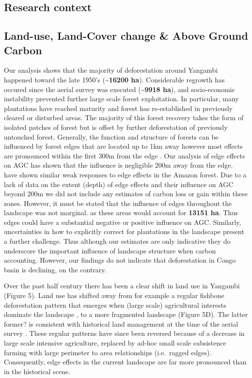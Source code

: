 \documentclass[remote sensing,article,submit,moreauthors,pdftex]{mdpi}
\begin{document}
\hypertarget{research-context}{%
\subsection{Research context}\label{research-context}}

\hypertarget{land-use-land-cover-change-above-ground-carbon}{%
\subsection{Land-use, Land-Cover change \& Above Ground
Carbon}\label{land-use-land-cover-change-above-ground-carbon}}

Our analysis shows that the majority of deforestation around Yangambi
happened toward the late 1950's (\textbf{\textasciitilde{}16200 ha}).
Considerable regrowth has occured since the aerial survey was executed
(\textbf{\textasciitilde{}9918 ha}), and socio-economic instability
prevented further large scale forest exploitation. In particular, many
plantations have reached maturity and forest has re-established in
previously cleared or disturbed areas. The majority of this forest
recovery takes the form of isolated patches of forest but is offset by
further deforestation of previously untouched forest. Generally, the
function and structure of forests can be influenced by forest edges that
are located up to 1km away however most effects are pronounced within
the first 300m from the edge \citep{gascon2000}. Our analysis of edge
effects on AGC has shown that the influence is negligible 200m away from
the edge. \citet{phillips2006} have shown similar weak responses to edge
effects in the Amazon forest. Due to a lack of data on the extent
(depth) of edge effects and their influence on AGC beyond 200m we did
not include any estimates of carbon loss or gain within these zones.
However, it must be stated that the influence of edges throughout the
landscape was not marginal. as these areas would account for
\textbf{13151 ha}. Thus edges could have a substantial negative
\citep{brinck2017} or positive \citep{reinmann2017} influence on AGC.
Similarly, uncertainties in how to explicitly correct for plantations in
the landscape present a further challenge. Thus although our estimates
are only indicative they do underscore the important influence of
landscape structure when carbon accounting. However, our findings do not
indicate that deforestation in Congo basin is declining, on the
contrary.

Over the past half century there has been a clear shift in land use in
Yangambi (Figure 5). Land use has shifted away from for example a
regular fishbone deforestation pattern that emerges when (large scale)
agricultural interests dominate the landscape \citep{arima2015}, to a
more fragmented landscape (Figure 5D). The latter former? is consistent
with historical land management at the time of the aerial survey
\citep{bustillo2018}. These regular patterns have since been reversed
because of a decrease in large scale intensive agriculture, replaced by
ad-hoc small scale subsistence farming with large perimeter to area
relationships (i.e.~ragged edges). Consequently, edge effects in the
current landscape are far more pronounced than in the historical scene.
\end{document}

